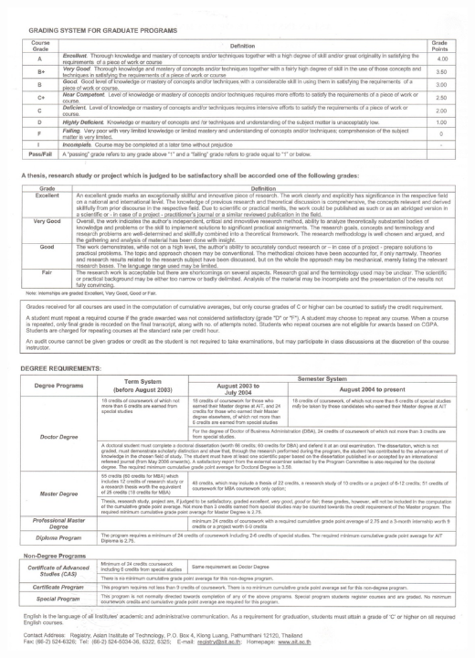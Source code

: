 \documentclass[11pt,a4paper,roman]{moderncv}        %
\begin{document}
\includegraphics[width=\textwidth]{images/master_2}
\end{document}

